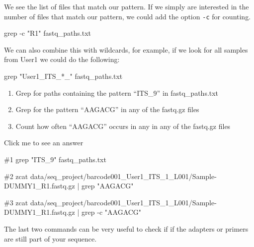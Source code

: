 \documentclass[
  letterpaper,
  DIV=11,
  numbers=noendperiod]{scrreprt}
\newenvironment{Shaded}{}{}
\newcommand{\AttributeTok}[1]{\textcolor[rgb]{0.84,0.23,0.29}{#1}}
\newcommand{\CommentTok}[1]{\textcolor[rgb]{0.42,0.45,0.49}{#1}}
\newcommand{\FunctionTok}[1]{\textcolor[rgb]{0.44,0.26,0.76}{#1}}
\newcommand{\KeywordTok}[1]{\textcolor[rgb]{0.84,0.23,0.29}{#1}}
\newcommand{\NormalTok}[1]{\textcolor[rgb]{0.14,0.16,0.18}{#1}}
\newcommand{\StringTok}[1]{\textcolor[rgb]{0.01,0.18,0.38}{#1}}
\providecommand{\tightlist}{%
  \setlength{\itemsep}{0pt}\setlength{\parskip}{0pt}}\usepackage{longtable,booktabs,array}
\begin{document}
We see the list of files that match our pattern. If we simply are
interested in the number of files that match our pattern, we could add
the option \texttt{-c} for counting.

\begin{Shaded}
\begin{Highlighting}[]
\FunctionTok{grep} \AttributeTok{{-}c} \StringTok{"R1"}\NormalTok{ fastq\_paths.txt}
\end{Highlighting}
\end{Shaded}

We can also combine this with wildcards, for example, if we look for all
samples from User1 we could do the following:

\begin{Shaded}
\begin{Highlighting}[]
\FunctionTok{grep} \StringTok{"User1\_ITS\_*\_"}\NormalTok{ fastq\_paths.txt}
\end{Highlighting}
\end{Shaded}

\begin{tcolorbox}[enhanced jigsaw, bottomtitle=1mm, colframe=quarto-callout-caution-color-frame, left=2mm, leftrule=.75mm, coltitle=black, colbacktitle=quarto-callout-caution-color!10!white, toprule=.15mm, rightrule=.15mm, opacityback=0, titlerule=0mm, colback=white, breakable, bottomrule=.15mm, title=\textcolor{quarto-callout-caution-color}{\faFire}\hspace{0.5em}{Exercise}, arc=.35mm, toptitle=1mm, opacitybacktitle=0.6]

\begin{enumerate}
\def\labelenumi{\arabic{enumi}.}
\tightlist
\item
  Grep for paths containing the pattern ``ITS\_9'' in fastq\_paths.txt
\item
  Grep for the pattern ``AAGACG'' in any of the fastq.gz files
\item
  Count how often ``AAGACG'' occurs in any in any of the fastq.gz files
\end{enumerate}

Click me to see an answer

\begin{Shaded}
\begin{Highlighting}[]
\CommentTok{\#1}
\FunctionTok{grep} \StringTok{"ITS\_9"}\NormalTok{ fastq\_paths.txt}

\CommentTok{\#2}
\FunctionTok{zcat}\NormalTok{ data/seq\_project/barcode001\_User1\_ITS\_1\_L001/Sample{-}DUMMY1\_R1.fastq.gz }\KeywordTok{|} \FunctionTok{grep} \StringTok{"AAGACG"}

\CommentTok{\#3}
\FunctionTok{zcat}\NormalTok{ data/seq\_project/barcode001\_User1\_ITS\_1\_L001/Sample{-}DUMMY1\_R1.fastq.gz }\KeywordTok{|} \FunctionTok{grep} \AttributeTok{{-}c} \StringTok{"AAGACG"}
\end{Highlighting}
\end{Shaded}

The last two commands can be very useful to check if if the adapters or
primers are still part of your sequence.

\end{tcolorbox}
\end{document}
